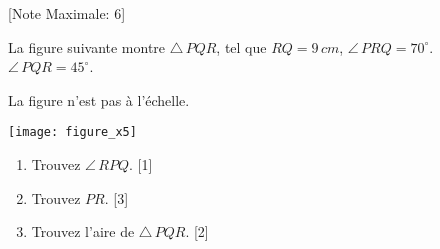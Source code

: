 \begin{question}
  \hspace*{\fill} [Note Maximale: 6]\par
  \medskip
  \noindent La figure suivante montre $\bigtriangleup\,PQR$, tel que $RQ = 9\,cm$, $\angle\,PRQ = 70^\circ$. $\angle\,PQR = 45^\circ$.\par
  \medskip
  \begin{center} %
    \noindent La figure n'est pas à l'échelle.\par
    \texttt{[image: figure\_x5]}\par
  \end{center} %
  \begin{enumerate}[label=(\alph*)]
    \item Trouvez $\angle\,RPQ$.\hspace*{\fill} [1]
    \item Trouvez $PR$.\hspace*{\fill} [3]
    \item Trouvez l'aire de $\bigtriangleup\,PQR$.\hspace*{\fill} [2]
  \end{enumerate}
\end{question}

